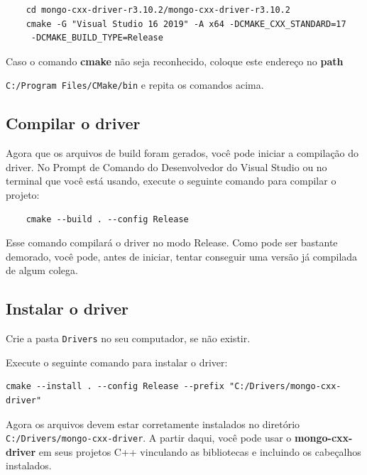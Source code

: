 \documentclass[a4paper,11pt]{article}
\begin{document}
\begin{mdframed}
	\begin{verbatim}
	cd mongo-cxx-driver-r3.10.2/mongo-cxx-driver-r3.10.2
	cmake -G "Visual Studio 16 2019" -A x64 -DCMAKE_CXX_STANDARD=17
	 -DCMAKE_BUILD_TYPE=Release
	\end{verbatim}
\end{mdframed}

Caso o comando \textbf{cmake} não seja reconhecido, coloque este endereço no \textbf{path}

{\tt C:/Program Files/CMake/bin} e repita os comandos acima.

\subsection*{Compilar o driver}

Agora que os arquivos de build foram gerados, você pode iniciar a compilação do driver. No Prompt de Comando do Desenvolvedor do Visual Studio ou no terminal que você está usando, execute o seguinte comando para compilar o projeto:

\begin{mdframed}
	\begin{verbatim}
	cmake --build . --config Release
	\end{verbatim}
\end{mdframed}

Esse comando compilará o driver no modo Release. Como pode ser bastante demorado, você pode, antes de iniciar, tentar conseguir uma versão já compilada de algum colega.

\subsection*{Instalar o driver}

Crie a pasta {\tt Drivers} no seu computador, se não existir.

Execute o seguinte comando para instalar o driver:
\begin{mdframed}
	\begin{verbatim}
cmake --install . --config Release --prefix "C:/Drivers/mongo-cxx-driver"
	\end{verbatim}
\end{mdframed}

Agora os arquivos devem estar corretamente instalados no diretório {\tt C:/Drivers/mongo-cxx-driver}. A partir daqui, você pode usar o \textbf{mongo-cxx-driver} em seus projetos C++ vinculando as bibliotecas e incluindo os cabeçalhos instalados.
\end{document}
